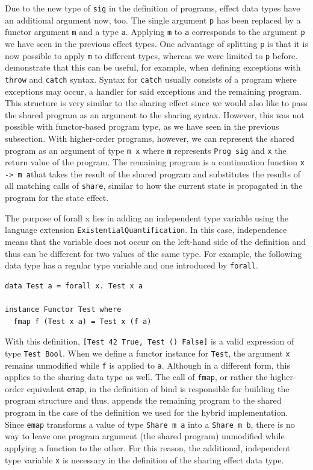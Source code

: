 \documentclass[a4paper, 11pt, fleqn, twoside]{scrreprt}
\newcommand{\hinl}[1]{\texttt{#1}}
\begin{document}
Due to the new type of \hinl{sig} in the definition of programs, effect data types have an additional argument now, too.
The single argument \hinl{p} has been replaced by a functor argument \hinl{m} and a type \hinl{a}.
Applying \hinl{m} to \hinl{a} corresponds to the argument \hinl{p} we have seen in the previous effect types.
One advantage of splitting \hinl{p} is that it is now possible to apply \hinl{m} to different types, whereas we were limited to \hinl{p} before.
\citet{wu2014effect} demonstrate that this can be useful, for example, when defining exceptions with \hinl{throw} and \hinl{catch} syntax.
Syntax for \hinl{catch} usually consists of a program where exceptions may occur, a handler for said exceptions and the remaining program.
This structure is very similar to the sharing effect since we would also like to pass the shared program as an argument to the sharing syntax.
However, this was not possible with functor-based program type, as we have seen in the previous subsection.
With higher-order programs, however, we can represent the shared program as an argument of type \hinl{m x} where \hinl{m} represents \hinl{Prog sig} and \hinl{x} the return value of the program.
The remaining program is a continuation function \hinl{x -> m a}that takes the result of the shared program and substitutes the results of all matching calls of \hinl{share}, similar to how the current state is propagated in the program for the state effect.

The purpose of {forall x} lies in adding an independent type variable using the language extension \hinl{ExistentialQuantification}.
In this case, independence means that the variable does not occur on the left-hand side of the definition and thus can be different for two values of the same type.
For example, the following data type has a regular type variable and one introduced by \hinl{forall}.

\begin{verbatim}
data Test a = forall x. Test x a

instance Functor Test where
  fmap f (Test x a) = Test x (f a)
\end{verbatim}

With this definition, \hinl{[Test 42 True, Test () False]} is a valid expression of type \hinl{Test Bool}.
When we define a functor instance for \hinl{Test}, the argument \hinl{x} remains unmodified while \hinl{f} is applied to \hinl{a}.
Although in a different form, this applies to the sharing data type as well.
The call of \hinl{fmap}, or rather the higher-order equivalent \hinl{emap}, in the definition of bind is responsible for building the program structure and thus, appends the remaining program to the shared program in the case of the definition we used for the hybrid implementation.
Since \hinl{emap} transforms a value of type \hinl{Share m a} into a \hinl{Share m b}, there is no way to leave one program argument (the shared program) unmodified while applying a function to the other.
For this reason, the additional, independent type variable \hinl{x} is necessary in the definition of the sharing effect data type.
\end{document}
